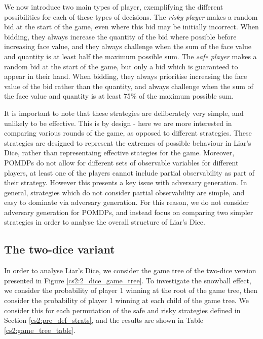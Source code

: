 We now introduce two main types of player, exemplifying the different possibilities for each of these types of decisions. The \emph{risky player} makes a random bid at the start of the game, even where this bid may be initially incorrect. When bidding, they always increase the quantity of the bid where possible before increasing face value, and they always challenge when the sum of the face value and quantity is at least half the maximum possible sum. The \emph{safe player} makes a random bid at the start of the game, but only a bid which is guaranteed to appear in their hand. When bidding, they always prioritise increasing the face value of the bid rather than the quantity, and always challenge when the sum of the face value and quantity is at least 75\% of the maximum possible sum.

It is important to note that these strategies are deliberately very simple, and unlikely to be effective. This is by design - here we are more interested in comparing various rounds of the game, as opposed to different strategies. These strategies are designed to represent the extremes of possible behaviour in Liar's Dice, rather than representaing effective stategies for the game. Moreover, POMDPs do not allow for different sets of observable variables for different players, at least one of the players cannot include partial observability as part of their strategy. However this presents a key issue with adversary generation. In general, strategies which do not consider partial observability are simple, and easy to dominate via adversary generation. For this reason, we do not consider adversary generation for POMDPs, and instead focus on comparing two simpler strategies in order to analyse the overall structure of Liar's Dice.

\subsection{The two-dice variant}

In order to analyse Liar's Dice, we consider the game tree of the two-dice version presented in Figure \ref{cs2:2_dice_game_tree}. To investigate the snowball effect, we consider the probability of player 1 winning at the root of the game tree, then consider the probability of player 1 winning at each child of the game tree. We consider this for each permutation of the safe and risky strategies defined in Section \ref{cs2:pre_def_strats}, and the results are shown in Table \ref{cs2:game_tree_table}.

